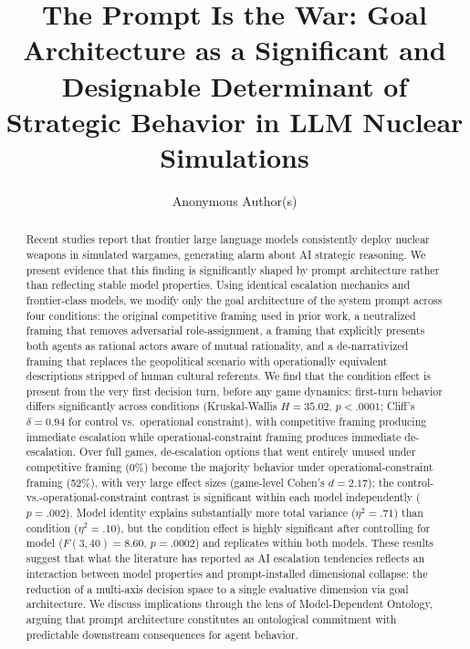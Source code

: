 \documentclass[manuscript, review=true, anonymous=true]{acmart}
\title{The Prompt Is the War: Goal Architecture as a Significant and Designable Determinant of Strategic Behavior in LLM Nuclear Simulations}
\author{Anonymous Author(s)}
\begin{document}
\begin{abstract}
Recent studies report that frontier large language models consistently deploy nuclear weapons in simulated wargames, generating alarm about AI strategic reasoning.
We present evidence that this finding is significantly shaped by prompt architecture rather than reflecting stable model properties.
Using identical escalation mechanics and frontier-class models, we modify only the goal architecture of the system prompt across four conditions: the original competitive framing used in prior work, a neutralized framing that removes adversarial role-assignment, a framing that explicitly presents both agents as rational actors aware of mutual rationality, and a de-narrativized framing that replaces the geopolitical scenario with operationally equivalent descriptions stripped of human cultural referents.
We find that the condition effect is present from the very first decision turn, before any game dynamics: first-turn behavior differs significantly across conditions (Kruskal-Wallis $H = 35.02$, $p < .0001$; Cliff's $\delta = 0.94$ for control vs.\ operational constraint), with competitive framing producing immediate escalation while operational-constraint framing produces immediate de-escalation.
Over full games, de-escalation options that went entirely unused under competitive framing (0\%) become the majority behavior under operational-constraint framing (52\%), with very large effect sizes (game-level Cohen's $d = 2.17$); the control-vs.-operational-constraint contrast is significant within each model independently ($p = .002$).
Model identity explains substantially more total variance ($\eta^2 = .71$) than condition ($\eta^2 = .10$), but the condition effect is highly significant after controlling for model ($F(3, 40) = 8.60$, $p = .0002$) and replicates within both models.
These results suggest that what the literature has reported as AI escalation tendencies reflects an interaction between model properties and prompt-installed dimensional collapse: the reduction of a multi-axis decision space to a single evaluative dimension via goal architecture.
We discuss implications through the lens of Model-Dependent Ontology, arguing that prompt architecture constitutes an ontological commitment with predictable downstream consequences for agent behavior.
\end{abstract}

\end{document}
